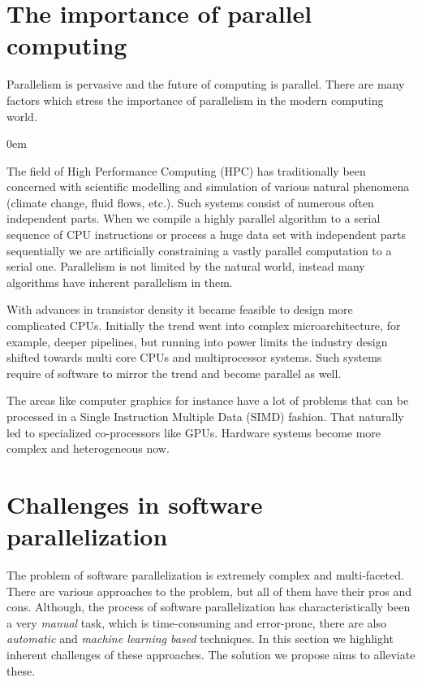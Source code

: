 \section{The importance of parallel computing}
\label{backgrnd_importance}
\quad Parallelism is pervasive and the future of computing is parallel. There are many factors which stress the importance of parallelism in the modern computing world.
\begin{description}[style=unboxed,leftmargin=0cm]
\itemsep0em
\item[Abundance of natural parallelism] The field of High Performance Computing (HPC) has traditionally been concerned with scientific modelling and simulation of various natural phenomena (climate change, fluid flows, etc.). Such systems consist of numerous often independent parts. When we compile a highly parallel algorithm to a serial sequence of CPU instructions or process a huge data set with independent parts sequentially we are artificially constraining a vastly parallel computation to a serial one. Parallelism is not limited by the natural world, instead many algorithms have inherent parallelism in them.
\item[Semiconductor technology advances and power limits] With advances in transistor density it became feasible to design more complicated CPUs. Initially the trend went into complex microarchitecture, for example, deeper pipelines, but running into power limits the industry design shifted towards multi core CPUs and multiprocessor systems. Such systems require of software to mirror the trend and become parallel as well.
\item[Domain inherent parallelism and specialized computations] The areas like computer graphics for instance have a lot of problems that can be processed in a Single Instruction Multiple Data (SIMD) fashion. That naturally led to specialized co-processors like GPUs. Hardware systems become more complex and heterogeneous now.
\end{description}
\section{Challenges in software parallelization}
\label{backgrnd_challenges}
\quad The problem of software parallelization is extremely complex and multi-faceted. There are various approaches to the problem, but all of them have their pros and cons. Although, the process of software parallelization has characteristically been a very \textit{manual} task, which is time-consuming and error-prone, there are also \textit{automatic} and \textit{machine learning based} techniques. In this section we highlight inherent challenges of these approaches. The solution we propose aims to alleviate these.
